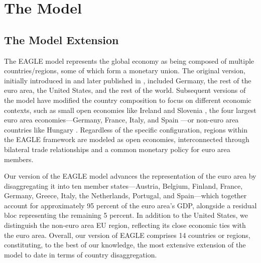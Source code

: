 \documentclass[a4paper,11pt]{article}
\numberwithin{equation}{section}
\begin{document}
\section{The Model}

\subsection{The Model Extension}

The EAGLE model represents the global economy as being composed of multiple countries/regions, some of which form a monetary union.
The original version, initially introduced in \citet{Gomesaetal2010ecbwp} and later published in \citet{GomesEtAl2010ecbwp}, included Germany, the rest of the euro area, the United States, and the rest of the world.
Subsequent versions of the model have modified the country composition to focus on different economic contexts, such as small open economies like Ireland and Slovenia \citep{Clancyetal2016}, the four largest euro area economies---Germany, France, Italy, and Spain \citep{BokanEtAl2018em}---or non-euro area countries like Hungary \citep{BekesiEtAl2017mnbwp}.
Regardless of the specific configuration, regions within the EAGLE framework are modeled as open economies, interconnected through bilateral trade relationships and a common monetary policy for euro area members.

Our version of the EAGLE model advances the representation of the euro area by disaggregating it into ten member states---Austria, Belgium, Finland, France, Germany, Greece, Italy, the Netherlands, Portugal, and Spain---which together account for approximately 95 percent of the euro area's GDP, alongside a residual bloc representing the remaining 5 percent.
In addition to the United States, we distinguish the non-euro area EU region, reflecting its close economic ties with the euro area.
Overall, our version of EAGLE comprises 14 countries or regions, constituting, to the best of our knowledge, the most extensive extension of the model to date in terms of country disaggregation.
\end{document}
